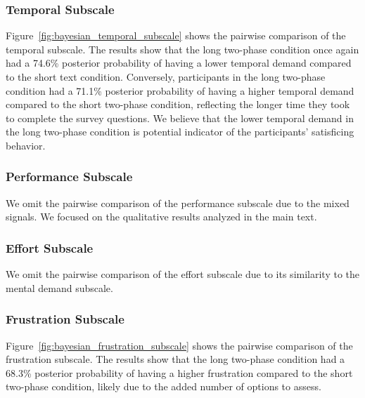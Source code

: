 \subsubsection{Temporal Subscale}
\label{sec:temporal_subscale_bayesian}
Figure~\ref{fig:bayesian_temporal_subscale} shows the pairwise comparison of the temporal subscale. The results show that the long two-phase condition once again had a 74.6\% posterior probability of having a lower temporal demand compared to the short text condition. Conversely, participants in the long two-phase condition had a 71.1\% posterior probability of having a higher temporal demand compared to the short two-phase condition, reflecting the longer time they took to complete the survey questions. We believe that the lower temporal demand in the long two-phase condition is potential indicator of the participants' satisficing behavior.

\subsubsection{Performance Subscale}
We omit the pairwise comparison of the performance subscale due to the mixed signals. We focused on the qualitative results analyzed in the main text.

\subsubsection{Effort Subscale}
We omit the pairwise comparison of the effort subscale due to its similarity to the mental demand subscale. 

\subsubsection{Frustration Subscale}
Figure~\ref{fig:bayesian_frustration_subscale} shows the pairwise comparison of the frustration subscale. The results show that the long two-phase condition had a 68.3\% posterior probability of having a higher frustration compared to the short two-phase condition, likely due to the added number of options to assess. 

